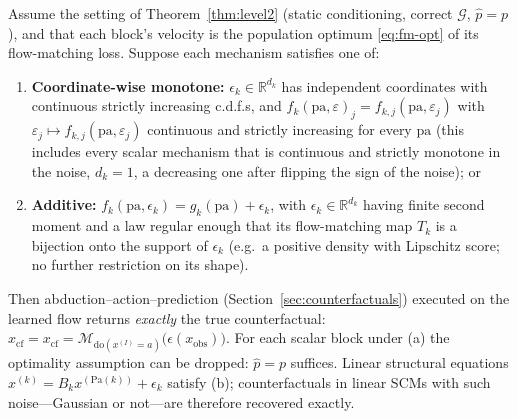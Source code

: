 \begin{theorem}
\label{thm:level3}
Assume the setting of Theorem~\ref{thm:level2} (static conditioning, correct $\mathcal{G}$,
$\hat p = p$), and that each block's velocity is the population optimum
\eqref{eq:fm-opt} of its flow-matching loss. Suppose each mechanism satisfies one of:
\begin{enumerate}
  \item[(a)] \textbf{Coordinate-wise monotone:} $\epsilon_k \in \mathbb{R}^{d_k}$ has independent
  coordinates with continuous strictly increasing c.d.f.s, and
  $f_k(\mathrm{pa}, \varepsilon)_j = f_{k,j}(\mathrm{pa}, \varepsilon_j)$ with
  $\varepsilon_j \mapsto f_{k,j}(\mathrm{pa}, \varepsilon_j)$ continuous and strictly
  increasing for every $\mathrm{pa}$ (this includes every scalar mechanism that is continuous
  and strictly monotone in the noise, $d_k = 1$, a decreasing one after flipping the sign of
  the noise); or
  \item[(b)] \textbf{Additive:} $f_k(\mathrm{pa}, \epsilon_k) = g_k(\mathrm{pa}) + \epsilon_k$,
  with $\epsilon_k \in \mathbb{R}^{d_k}$ having finite second moment and a law regular enough
  that its flow-matching map $T_k$ is a bijection onto the support of $\epsilon_k$ (e.g.\ a
  positive density with Lipschitz score; no further restriction on its shape).
\end{enumerate}
Then abduction--action--prediction (Section~\ref{sec:counterfactuals}) executed on the learned
flow returns \emph{exactly} the true counterfactual:
$\hat x_{\mathrm{cf}} = x_{\mathrm{cf}} =
\mathcal{M}_{\mathrm{do}(x^{(I)}=a)}\bigl(\epsilon(x_{\mathrm{obs}})\bigr)$.
For each scalar block under (a) the optimality assumption can be dropped: $\hat p = p$
suffices. Linear structural equations $x^{(k)} = B_k x^{(\mathrm{Pa}(k))} + \epsilon_k$ satisfy
(b); counterfactuals in linear SCMs with such noise---Gaussian or not---are therefore
recovered exactly.
\end{theorem}

